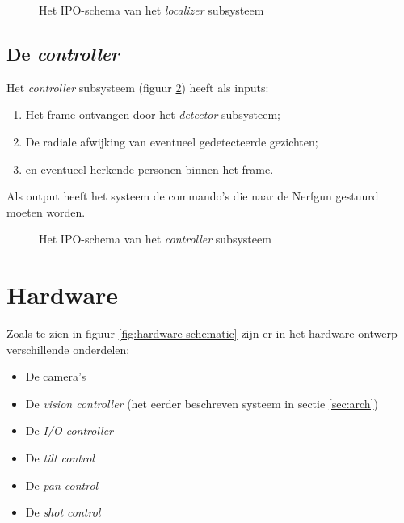 \begin{figure}[H]
    \begin{center}
        
    \end{center}
    \caption{Het IPO-schema van het \emph{localizer} subsysteem}
    \label{fig:ipo-localizer}
\end{figure}

\subsection{De \emph{controller}}

Het \emph{controller} subsysteem (figuur \ref{fig:ipo-controller}) heeft als inputs:

\begin{enumerate}
    \item Het frame ontvangen door het \emph{detector} subsysteem;
    \item De radiale afwijking van eventueel gedetecteerde gezichten;
    \item en eventueel herkende personen binnen het frame.
\end{enumerate}

Als output heeft het systeem de commando's die naar de Nerfgun gestuurd moeten
worden.

\begin{figure}[H]
    \begin{center}
        
    \end{center}
    \caption{Het IPO-schema van het \emph{controller} subsysteem}
    \label{fig:ipo-controller}
\end{figure}

\section{Hardware}

Zoals te zien in figuur \ref{fig:hardware-schematic} zijn er in het hardware
ontwerp verschillende onderdelen:

\begin{itemize}
    \item De camera's
    \item De \emph{vision controller} (het eerder beschreven systeem in sectie \ref{sec:arch})
    \item De \emph{I/O controller}
    \item De \emph{tilt control}
    \item De \emph{pan control}
    \item De \emph{shot control}
\end{itemize}

